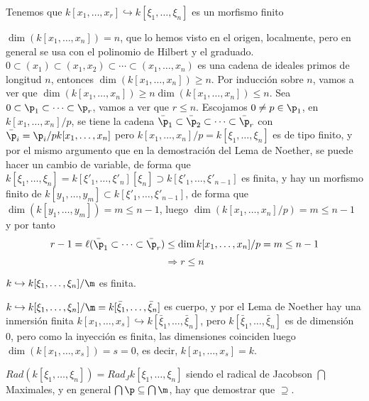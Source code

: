 Tenemos que $k[x_1, \ldots, x_r] \hookrightarrow k[\xi_1, \ldots, \xi_n]$ es un morfismo finito
\begin{obs}
    $\dim(k[x_1, \ldots, x_n] ) = n$, que lo hemos visto en el origen, localmente, pero en general se usa con el polinomio de Hilbert y el graduado. $ 0 \subset (x_1) \subset (x_1,x_2) \subset \cdots \subset (x_1, \ldots, x_n)$ es una cadena de ideales primos de longitud $n$, entonces $\dim(k[x_1, \ldots, x_n] ) \ge n$. Por inducci\'on sobre $n$, vamos a ver que $\dim(k[x_1, \ldots, x_n] ) \geq n\dim(k[x_1, \ldots, x_n] ) \le n$. Sea $0 \subset \p_1 \subset \cdots \subset \p_r$, vamos a ver que $r \le n$. Escojamos $0\neq p\in \p_1$, en $k[x_1,\ldots, x_n]/p $, se tiene la cadena $\bar \p_1 \subset \bar \p_2 \subset \cdots \subset \bar \p_r$ con $\bar \p_i = \p_i / p k[x_1, \ldots, x_n]$ pero $k[x_1,\ldots, x_n]/p =k[\xi_1, \ldots, \xi_n]$ es de tipo finito, y por el mismo argumento que en la demostraci\'on del Lema de Noether, se puede hacer un cambio de variable, de forma que $k[\xi_1, \ldots, \xi_n] = k[\xi'_1, \ldots, \xi'_n][\xi_n] \supset k[\xi'_1, \ldots, \xi'_{n-1}] $ es finita, y hay un morfismo finito de $k[y_1, \ldots, y_m] \subset k[\xi'_1, \ldots, \xi'_{n-1}]$, de forma que $\dim(k[y_1, \ldots, y_m]) = m \le n-1 $, luego $\dim(k[x_1,\ldots, x_n]/p) = m \le n-1$ y por tanto
    $$r-1 = \ell(\bar \p_1 \subset \cdots \subset \bar \p_r) \le \dim k[x_1,\ldots, x_n]/p  = m \le n-1$$
    $$\Rightarrow r \le n$$
\end{obs}
\begin{cor}
    $k \hookrightarrow k[\xi_1, \ldots, \xi_n]/\m$ es finita.
\end{cor}\begin{dem}
    $k \hookrightarrow k[\xi_1, \ldots, \xi_n]/\m = k[\bar \xi_1, \ldots, \bar \xi_n]$ es cuerpo, y por el Lema de Noether hay una inmersi\'on finita $k[x_1,\ldots, x_s] \hookrightarrow k[\bar \xi_1, \ldots, \bar \xi_n]$, pero $k[\bar \xi_1, \ldots, \bar \xi_n]$ es de dimensi\'on 0, pero como la inyecci\'on es finita, las dimensiones coinciden luego $\dim(k[x_1,\ldots, x_s] ) = s = 0$, es decir, $k[x_1,\ldots, x_s] = k$. 
\end{dem}
\begin{prop}
    $Rad(k[\xi_1, \ldots, \xi_n]) = Rad_{J}k[\xi_1, \ldots, \xi_n]$ siendo el radical de Jacobson $\bigcap $Maximales, y en general $\bigcap \p \subseteq \bigcap \m$, hay que demostrar que $\supseteq$. 
\end{prop}
